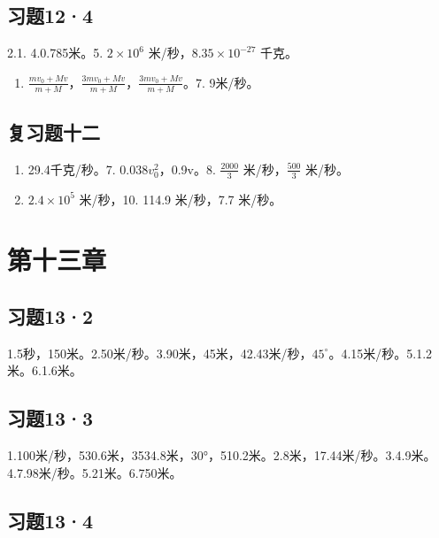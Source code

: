 \subsection{习题12·4}\label{ux4e60ux9898124-1}

2.1. 4.0.785米。5. \(2 \times 10^{6}\) 米/秒，\(8.35 \times 10^{-27}\)
千克。

\begin{enumerate}
\def\labelenumi{\arabic{enumi}.}
\setcounter{enumi}{5}
\tightlist
\item
  \(\frac{mv_0 + Mv}{m + M}\)，\(\frac{3mv_0 + Mv}{m + M}\)，\(\frac{3mv_0 + Mv}{m + M}\)。7.
  9米/秒。
\end{enumerate}

\subsection{复习题十二}\label{ux590dux4e60ux9898ux5341ux4e8c-1}

\begin{enumerate}
\def\labelenumi{\arabic{enumi}.}
\setcounter{enumi}{5}
\item
  29.4千克/秒。7. \(0.038v_{0}^{2}\)，0.9v。8. \(\frac{2000}{3}\)
  米/秒，\(\frac{500}{3}\) 米/秒。
\item
  \(2.4 \times 10^{5}\) 米/秒，10. 114.9 米/秒，7.7 米/秒。
\end{enumerate}

\section{第十三章}\label{ux7b2cux5341ux4e09ux7ae0}

\subsection{习题13·2}\label{ux4e60ux9898132-1}

1.5秒，150米。2.50米/秒。3.90米，45米，42.43米/秒，\(45^{\circ}\)。4.15米/秒。5.1.2米。6.1.6米。

\subsection{习题13·3}\label{ux4e60ux9898133-1}

1.100米/秒，530.6米，3534.8米，30°，510.2米。2.8米，17.44米/秒。3.4.9米。4.7.98米/秒。5.21米。6.750米。

\subsection{习题13·4}\label{ux4e60ux9898134-1}

